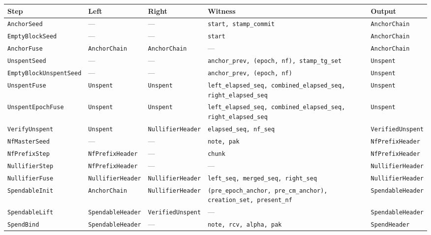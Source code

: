 \documentclass[11pt,a4paper]{article}
\theoremstyle{definition}
\begin{document}
\begin{table}[htbp]
\footnotesize
\setlength{\tabcolsep}{4pt}
\begin{tabular}{@{}lllp{3.9cm}l@{}}
\toprule
Step & Left & Right & Witness & Output \\
\midrule
\texttt{AnchorSeed} & --- & --- & \texttt{start, stamp\_commit}
  & \texttt{AnchorChain} \\
\texttt{EmptyBlockSeed} & --- & --- & \texttt{start}
  & \texttt{AnchorChain} \\
\texttt{AnchorFuse} & \texttt{AnchorChain} & \texttt{AnchorChain} & ---
  & \texttt{AnchorChain} \\
\texttt{UnspentSeed} & --- & --- & \texttt{anchor\_prev, (epoch, nf),
  stamp\_tg\_set} & \texttt{Unspent} \\
\texttt{EmptyBlockUnspentSeed} & --- & --- & \texttt{anchor\_prev,
  (epoch, nf)} & \texttt{Unspent} \\
\texttt{UnspentFuse} & \texttt{Unspent} & \texttt{Unspent}
  & \texttt{left\_elapsed\_seq, combined\_elapsed\_seq,
  right\_elapsed\_seq} & \texttt{Unspent} \\
\texttt{UnspentEpochFuse} & \texttt{Unspent} & \texttt{Unspent}
  & \texttt{left\_elapsed\_seq, combined\_elapsed\_seq,
  right\_elapsed\_seq} & \texttt{Unspent} \\
\texttt{VerifyUnspent} & \texttt{Unspent} & \texttt{NullifierHeader}
  & \texttt{elapsed\_seq, nf\_seq} & \texttt{VerifiedUnspent} \\
\texttt{NfMasterSeed} & --- & --- & \texttt{note, pak}
  & \texttt{NfPrefixHeader} \\
\texttt{NfPrefixStep} & \texttt{NfPrefixHeader} & --- & \texttt{chunk}
  & \texttt{NfPrefixHeader} \\
\texttt{NullifierStep} & \texttt{NfPrefixHeader} & --- & ---
  & \texttt{NullifierHeader} \\
\texttt{NullifierFuse} & \texttt{NullifierHeader} & \texttt{NullifierHeader}
  & \texttt{left\_seq, merged\_seq, right\_seq}
  & \texttt{NullifierHeader} \\
\texttt{SpendableInit} & \texttt{AnchorChain} & \texttt{NullifierHeader}
  & \texttt{(pre\_epoch\_anchor, pre\_cm\_anchor), creation\_set,
  present\_nf} & \texttt{SpendableHeader} \\
\texttt{SpendableLift} & \texttt{SpendableHeader} & \texttt{VerifiedUnspent}
  & --- & \texttt{SpendableHeader} \\
\texttt{SpendBind} & \texttt{SpendableHeader} & --- & \texttt{note, rcv,
  alpha, pak} & \texttt{SpendHeader} \\

\end{tabular}
\end{table}
\end{document}
